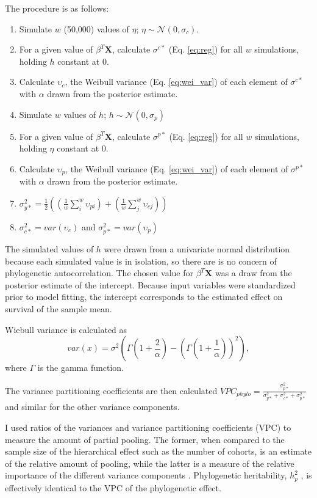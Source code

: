 \documentclass[12pt,letterpaper]{article}
\begin{document}
The procedure is as follows:
\begin{enumerate}
  \item Simulate \(w\) (50,000) values of \(\eta\); \(\eta \sim \mathcal{N}(0, \sigma_{c})\). 
  \item For a given value of \(\beta^{T} \mathbf{X}\), calculate \(\sigma^{c*}\) (Eq. \ref{eq:reg}) for all \(w\) simulations, holding \(h\) constant at 0.
  \item Calculate \(\upsilon_{c}\), the Weibull variance (Eq. \ref{eq:wei_var}) of each element of \(\sigma^{c*}\) with \(\alpha\) drawn from the posterior estimate.
  \item Simulate \(w\) values of \(h\); \(h \sim \mathcal{N}(0, \sigma_{p})\)
  \item For a given value of \(\beta^{T} \mathbf{X}\), calculate \(\sigma^{p*}\) (Eq. \ref{eq:reg}) for all \(w\) simulations, holding \(\eta\) constant at 0.
  \item Calculate \(\upsilon_{p}\), the Weibull variance (Eq. \ref{eq:wei_var}) of each element of \(\sigma^{p*}\) with \(\alpha\) drawn from the posterior estimate.
  \item \(\sigma_{y*}^{2} = \frac{1}{2} \left(\left(\frac{1}{w} \sum_{i}^{w} \upsilon_{pi}\right) + \left(\frac{1}{w} \sum_{j}^{w} \upsilon_{cj}\right)\right)\)
  \item \(\sigma_{c*}^{2} = var(\upsilon_{c})\) and \(\sigma_{p*}^{2} = var(\upsilon_{p})\)
\end{enumerate}

The simulated values of \(h\) were drawn from a univariate normal distribution because each simulated value is in isolation, so there are is no concern of phylogenetic autocorrelation. The chosen value for \(\beta^{T} \mathbf{X}\) was a draw from the posterior estimate of the intercept. Because input variables were standardized prior to model fitting, the intercept corresponds to the estimated effect on survival of the sample mean.

Wiebull variance is calculated as
\begin{equation}
  var(x) = \sigma^{2}\left(\Gamma\left(1 + \frac{2}{\alpha}\right) - \left(\Gamma\left(1 + \frac{1}{\alpha}\right)\right)^{2}\right),
  \label{eq:wei_var}
\end{equation}
where \(\Gamma\) is the gamma function. 

The variance partitioning coefficients are then calculated \(VPC_{phylo} = \frac{\sigma_{p*}^{2}}{\sigma_{y*}^{2} + \sigma_{c*}^{2} + \sigma_{p*}^{2}}\) and similar for the other variance components.

I used ratios of the variances and variance partitioning coefficients (VPC) to measure the amount of partial pooling. The former, when compared to the sample size of the hierarchical effect such as the number of cohorts, is an estimate of the relative amount of pooling, while the latter is a measure of the relative importance of the different variance components \citep{Gelman2007}. Phylogenetic heritability, \(h_{p}^{2}\) \citep{Housworth2004}, is effectively identical to the VPC of the phylogenetic effect.
\end{document}
